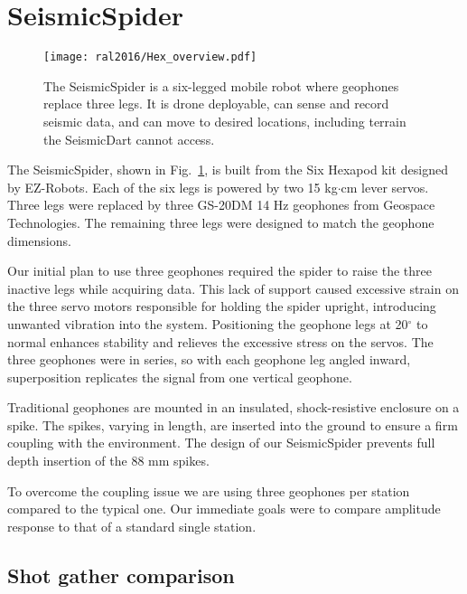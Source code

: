 \section[SeismicSpider]{SeismicSpider}


\begin{figure} \centering
  {\texttt{[image: ral2016/Hex\_overview.pdf]}}
 \caption{The SeismicSpider is a six-legged mobile robot where geophones replace three legs. It is drone deployable, can sense and record seismic data, and can move to desired locations, including terrain the SeismicDart cannot access.} 
 \label{fig:Hex_overview}
\end{figure}


The SeismicSpider, shown in Fig.~\ref{fig:Hex_overview}, is built from the Six Hexapod kit designed by EZ-Robots. Each of the six legs is powered by two 15 kg$\cdot$cm lever servos. Three legs were replaced by three GS-20DM 14 Hz geophones from Geospace Technologies. The remaining three legs were designed to match the geophone dimensions.

 Our initial plan to use three geophones required the spider to raise the three inactive legs while acquiring data. This lack of support caused excessive strain on the three servo motors responsible for holding the spider upright, introducing unwanted vibration into the system.  Positioning the geophone legs at 20$^\circ$ to normal enhances stability and relieves the excessive stress on the servos. 
 The three geophones were in series, so with each geophone leg angled inward, superposition replicates the signal from one vertical geophone.
 
 Traditional geophones are mounted in an insulated, shock-resistive enclosure on a spike. The spikes, varying in length, are inserted into the ground to ensure a firm coupling with the environment. The design of our SeismicSpider prevents full depth insertion of the 88 mm spikes. 

	To overcome the coupling issue we are using three geophones per station compared to the typical one. Our immediate goals were to compare amplitude response to that of a standard single station.	
 

\subsection{Shot gather comparison}

